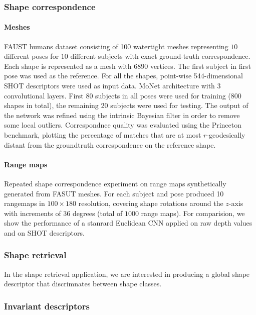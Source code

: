 \documentclass[pdftex,10pt,a4paper]{scrartcl}
\begin{document}
\subsubsection{Shape correspondence}

\paragraph{Meshes}

FAUST humans dataset consisting of 100 watertight meshes representing $10$ different poses for $10$ different subjects with exact ground-truth correspondence.
Each shape is represented as a mesh with $6890$ vertices.
The first subject in first pose was used as the reference.
For all the shapes, point-wise 544-dimensional SHOT descriptors were used as input data.
MoNet architecture with 3 convolutional layers.
First 80 subjects in all poses were used for training (800 shapes in total), the remaining 20 subjects were used for testing.
The output of the network was refined using the intrinsic Bayesian filter in order to remove some local outliers.
Correspondnce quality was evaluated using the Princeton benchmark, plotting the percentage of matches that are at most $r$-geodesically distant from the groundtruth correspondence on the reference shape.

\paragraph{Range maps}

Repeated shape correspondence experiment on range maps synthetically generated from FASUT meshes.
For each subject and pose produced 10 rangemaps in $100 \times 180$ resolution, covering shape rotations around the $z$-axis with increments of $36$ degrees (total of $1000$ range maps).
For comparision, we show the performance of a stanrard Euclidean CNN applied on raw depth values and on SHOT descriptors.

\subsubsection{Shape retrieval}

In the shape retrieval application, we are interested in producing a global shape descriptor that discrimnates between shape classes.

\subsubsection{Invariant descriptors}
\end{document}
